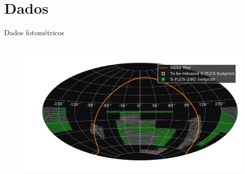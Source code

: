 \section{Dados}



\begin{frame}[c]{Dados fotométricos}
    \begin{figure}
        \centering
        \includegraphics[height=7cm]{script/images/splus_footprint_idr5.pdf}
    \end{figure}
\end{frame}


